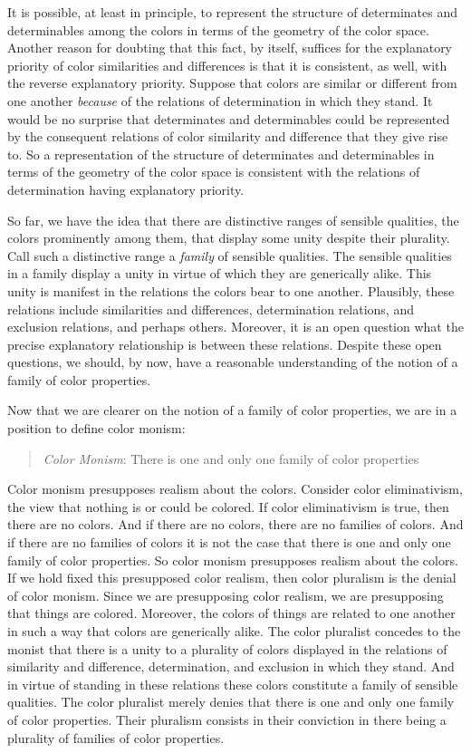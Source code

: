 \documentclass[12pt]{article}
\begin{document}
It is possible, at least in principle, to represent the structure of determinates and determinables among the colors in terms of the geometry of the color space. Another reason for doubting that this fact, by itself, suffices for the explanatory priority of color similarities and differences is that it is consistent, as well, with the reverse explanatory priority. Suppose that colors are similar or different from one another \emph{because} of the relations of determination in which they stand. It would be no surprise that determinates and determinables could be represented by the consequent relations of color similarity and difference that they give rise to. So a representation of the structure of determinates and determinables in terms of the geometry of the color space is consistent with the relations of determination having explanatory priority.

So far, we have the idea that there are distinctive ranges of sensible qualities, the colors prominently among them, that display some unity despite their plurality. Call such a distinctive range a \emph{family} of sensible qualities. The sensible qualities in a family display a unity in virtue of which they are generically alike. This unity is manifest in the relations the colors bear to one another. Plausibly, these relations include similarities and differences, determination relations, and exclusion relations, and perhaps others. Moreover, it is an open question what the precise explanatory relationship is between these relations. Despite these open questions, we should, by now, have a reasonable understanding of the notion of a family of color properties.

Now that we are clearer on the notion of a family of color properties, we are in a position to define color monism:
\begin{quote}
	\emph{Color Monism}: There is one and only one family of color properties
\end{quote}
Color monism presupposes realism about the colors. Consider color eliminativism, the view that nothing is or could be colored. If color eliminativism is true, then there are no colors. And if there are no colors, there are no families of colors. And if there are no families of colors it is not the case that there is one and only one family of color properties. So color monism presupposes realism about the colors. If we hold fixed this presupposed color realism, then color pluralism is the denial of color monism. Since we are presupposing color realism, we are presupposing that things are colored. Moreover, the colors of things are related to one another in such a way that colors are generically alike. The color pluralist concedes to the monist that there is a unity to a plurality of colors displayed in the relations of similarity and difference, determination, and exclusion in which they stand. And in virtue of standing in these relations these colors constitute a family of sensible qualities. The color pluralist merely denies that there is one and only one family of color properties. Their pluralism consists in their conviction in there being a plurality of families of color properties.
\end{document}
